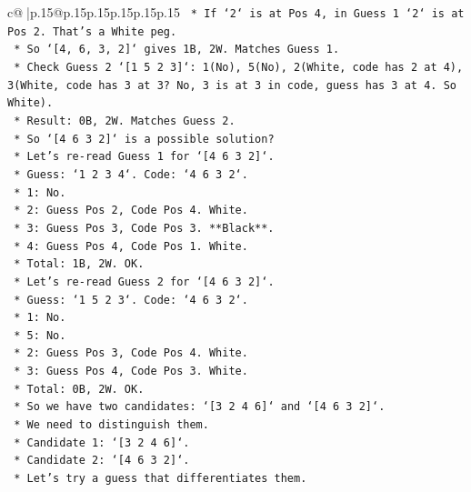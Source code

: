 \documentclass{article}
\begin{document}
{\begin{supertabular}{c@{$\;$}|p{.15\linewidth}@{}p{.15\linewidth}p{.15\linewidth}p{.15\linewidth}p{.15\linewidth}p{.15\linewidth}}
{{{\texttt{                *   If `2` is at Pos 4, in Guess 1 `2` is at Pos 2. That's a White peg.} \\
\texttt{                *   So `{[}4, 6, 3, 2{]}` gives 1B, 2W. Matches Guess 1.} \\
\texttt{                *   Check Guess 2 `{[}1 5 2 3{]}`: 1(No), 5(No), 2(White, code has 2 at 4), 3(White, code has 3 at 3? No, 3 is at 3 in code, guess has 3 at 4. So White).} \\
\texttt{                *   Result: 0B, 2W. Matches Guess 2.} \\
\texttt{            *   So `{[}4 6 3 2{]}` is a possible solution?} \\
\texttt{            *   Let's re{-}read Guess 1 for `{[}4 6 3 2{]}`.} \\
\texttt{                *   Guess: `1 2 3 4`. Code: `4 6 3 2`.} \\
\texttt{                *   1: No.} \\
\texttt{                *   2: Guess Pos 2, Code Pos 4. White.} \\
\texttt{                *   3: Guess Pos 3, Code Pos 3. **Black**.} \\
\texttt{                *   4: Guess Pos 4, Code Pos 1. White.} \\
\texttt{                *   Total: 1B, 2W. OK.} \\
\texttt{            *   Let's re{-}read Guess 2 for `{[}4 6 3 2{]}`.} \\
\texttt{                *   Guess: `1 5 2 3`. Code: `4 6 3 2`.} \\
\texttt{                *   1: No.} \\
\texttt{                *   5: No.} \\
\texttt{                *   2: Guess Pos 3, Code Pos 4. White.} \\
\texttt{                *   3: Guess Pos 4, Code Pos 3. White.} \\
\texttt{                *   Total: 0B, 2W. OK.} \\
\texttt{            *   So we have two candidates: `{[}3 2 4 6{]}` and `{[}4 6 3 2{]}`.} \\
\texttt{            *   We need to distinguish them.} \\
\texttt{            *   Candidate 1: `{[}3 2 4 6{]}`.} \\
\texttt{            *   Candidate 2: `{[}4 6 3 2{]}`.} \\
\texttt{            *   Let's try a guess that differentiates them.} \\
}}}
\end{supertabular}}
\end{document}
